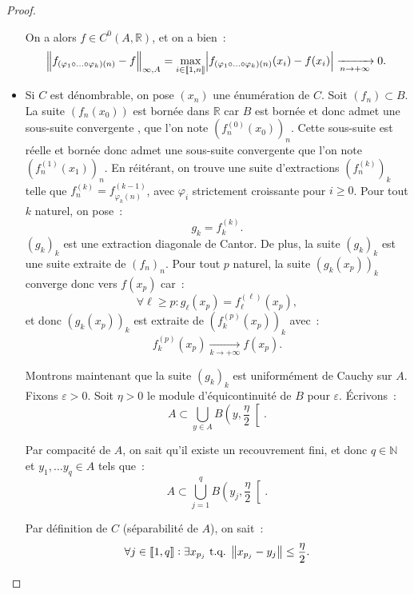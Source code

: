 \documentclass{report}
\theoremstyle{definition}
\theoremstyle{remark}
\numberwithin{equation}{section}
\newcommand{\R}{\mathbb R}
\newcommand{\N}{\mathbb N}
\newcommand{\tq}{\text{ t.q. }}
\newcommand{\intint}[2]{\left\llbracket#1, #2\right\rrbracket}
\newcommand{\pinfty}{{+\infty}}
\begin{document}
\begin{proof}
\begin{itemize}
				On a alors $f \in C^0(A, \R)$, et on a bien~:
				\begin{equation}
					\norm {f_{(\varphi_1 \circ \ldots \circ \varphi_k)(n)} - f}_{\infty, A} =
					\max_{i \in \intint 1n}\abs {f_{(\varphi_1 \circ \ldots \circ \varphi_k)(n)}(x_i) - f(x_i)}
					\xrightarrow[n \to \pinfty]{} 0.
				\end{equation}
				\item Si $C$ est dénombrable, on pose $(x_n)$ une énumération de $C$. Soit $(f_n) \subset B$. La suite $(f_n(x_0))$ est bornée dans $\R$ car
				$B$ est bornée et donc admet une sous-suite convergente , que l'on note $(f^{(0)}_n(x_0))_n$. Cette sous-suite est réelle et bornée donc admet
				une sous-suite convergente que l'on note $(f^{(1)}_n(x_1))_n$. En réitérant, on trouve une suite d'extractions $(f^{(k)}_n)_k$ telle que
				$f^{(k)}_n = f^{(k-1)}_{\varphi_k(n)}$, avec $\varphi_i$ strictement croissante pour $i \geq 0$. Pour tout $k$ naturel, on pose~:
				\begin{equation}
					g_k = f^{(k)}_k.
				\end{equation}
				$(g_k)_k$ est une extraction diagonale de Cantor. De plus, la suite $(g_k)_k$ est une suite extraite de $(f_n)_n$. Pour tout $p$ naturel, la
				suite $(g_k(x_p))_k$ converge donc vers $f(x_p)$ car~:
				\begin{equation}
					\forall \ell \geq p : g_\ell(x_p) = f^{(\ell)}_\ell(x_p),
				\end{equation}
				et donc $(g_k(x_p))_k$ est extraite de $(f_k^{(p)}(x_p))_k$ avec~:
				\begin{equation}
					f_k^{(p)}(x_p) \xrightarrow[k \to \pinfty]{} f(x_p).
				\end{equation}

				Montrons maintenant que la suite $(g_k)_k$ est uniformément de Cauchy sur $A$. Fixons $\varepsilon > 0$. Soit $\eta > 0$ le module d'équicontinuité
				de $B$ pour $\varepsilon$. Écrivons~:
				\begin{equation}
					A \subset \bigcup_{y \in A}B\left(y, \frac \eta2\right[.
				\end{equation}

				Par compacité de $A$, on sait qu'il existe un recouvrement fini, et donc $q \in \N$ et $y_1, \ldots y_q \in A$ tels que~:
				\begin{equation}
					A \subset \bigcup_{j=1}^qB\left(y_j, \frac \eta2\right[.
				\end{equation}

				Par définition de $C$ (séparabilité de $A$), on sait~:
				\begin{equation}
					\forall j \in \intint 1q : \exists x_{p_j} \tq \norm {x_{p_j} - y_j} \leq \frac \eta2.
				\end{equation}


\end{itemize}
\end{proof}
\end{document}
